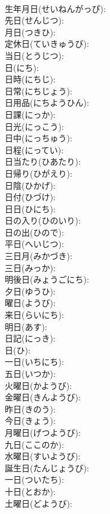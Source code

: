 \documentclass[8pt]{extreport}
\begin{document}
\begin{CJK}{UTF8}{min}
\\	生年月日(せいねんがっぴ): 
\\	先日(せんじつ): 
\\	月日(つきひ): 
\\	定休日(ていきゅうび): 
\\	当日(とうじつ): 
\\	日(にち): 
\\	日時(にちじ): 
\\	日常(にちじょう): 
\\	日用品(にちようひん): 
\\	日課(にっか): 
\\	日光(にっこう): 
\\	日中(にっちゅう): 
\\	日程(にってい): 
\\	日当たり(ひあたり): 
\\	日帰り(ひがえり): 
\\	日陰(ひかげ): 
\\	日付(ひづけ): 
\\	日日(ひにち): 
\\	日の入り(ひのいり): 
\\	日の出(ひので): 
\\	平日(へいじつ): 
\\	三日月(みかづき): 
\\	三日(みっか): 
\\	明後日(みょうごにち): 
\\	夕日(ゆうひ): 
\\	曜日(ようび): 
\\	来日(らいにち): 
\\	明日(あす): 
\\	日記(にっき): 
\\	日(ひ): 
\\	一日(いちにち): 
\\	五日(いつか): 
\\	火曜日(かようび): 
\\	金曜日(きんようび): 
\\	昨日(きのう): 
\\	今日(きょう): 
\\	月曜日(げつようび): 
\\	九日(ここのか): 
\\	水曜日(すいようび): 
\\	誕生日(たんじょうび): 
\\	一日(ついたち): 
\\	十日(とおか): 
\\	土曜日(どようび): 

\end{CJK}
\end{document}
